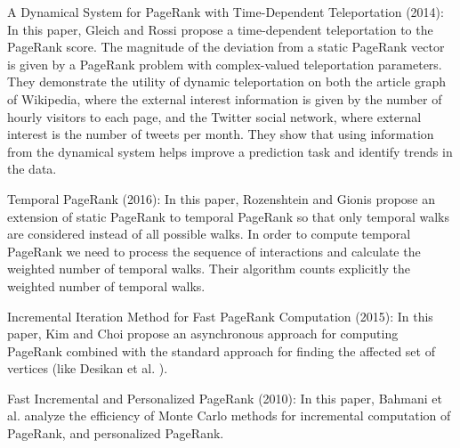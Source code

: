 A Dynamical System for PageRank with Time-Dependent Teleportation (2014): In this paper, Gleich and Rossi \cite{gleich2014dynamical} propose a time-dependent teleportation to the PageRank score. The magnitude of the deviation from a static PageRank vector is given by a PageRank problem with complex-valued teleportation parameters. They demonstrate the utility of dynamic teleportation on both the article graph of Wikipedia, where the external interest information is given by the number of hourly visitors to each page, and the Twitter social network, where external interest is the number of tweets per month. They show that using information from the dynamical system helps improve a prediction task and identify trends in the data.

Temporal PageRank (2016): In this paper, Rozenshtein and Gionis \cite{rozenshtein2016temporal} propose an extension of static PageRank to temporal PageRank so that only temporal walks are considered instead of all possible walks. In order to compute temporal PageRank we need to process the sequence of interactions and calculate the weighted number of temporal walks. Their algorithm counts explicitly the weighted number of temporal walks.

Incremental Iteration Method for Fast PageRank Computation (2015): In this paper, Kim and Choi \cite{kim2015incremental} propose an asynchronous approach for computing PageRank combined with the standard approach for finding the affected set of vertices (like Desikan et al. \cite{rank-desikan05}).

Fast Incremental and Personalized PageRank (2010): In this paper, Bahmani et al. \cite{bahmani2010fast} analyze the efficiency of Monte Carlo methods for incremental computation of PageRank, and personalized PageRank.
